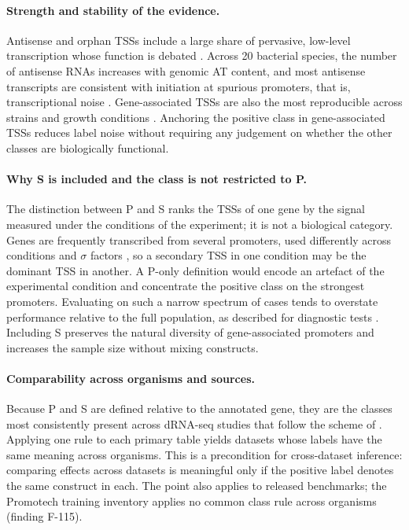 \paragraph{Strength and stability of the evidence.}
Antisense and orphan TSSs include a large share of pervasive, low-level
transcription whose function is debated \citep{wade2014pervasive}. Across 20
bacterial species, the number of antisense RNAs increases with genomic AT
content, and most antisense transcripts are consistent with initiation at
spurious promoters, that is, transcriptional noise
\citep{llorensrico2016antisense}. Gene-associated TSSs are also the most
reproducible across strains \citep{dugar2013campylobacter} and growth
conditions \citep{zhukova2017leptospira}. Anchoring the positive class in
gene-associated TSSs reduces label noise without requiring any judgement on
whether the other classes are biologically functional.

\paragraph{Why S is included and the class is not restricted to P.}
The distinction between P and S ranks the TSSs of one gene by the signal
measured under the conditions of the experiment; it is not a biological
category. Genes are frequently transcribed from several promoters, used
differently across conditions and $\sigma$ factors
\citep{cho2009transcription,mendozavargas2009genome}, so a secondary TSS in one
condition may be the dominant TSS in another. A P-only definition would encode
an artefact of the experimental condition and concentrate the positive class on
the strongest promoters. Evaluating on such a narrow spectrum of cases tends to
overstate performance relative to the full population, as described for
diagnostic tests \citep{ransohoff1978spectrum}. Including S preserves the
natural diversity of gene-associated promoters and increases the sample size
without mixing constructs.

\paragraph{Comparability across organisms and sources.}
Because P and S are defined relative to the annotated gene, they are the classes
most consistently present across dRNA-seq studies that follow the scheme of
\citet{sharma2010primary}
\citep{albrecht2011chlamydia,dugar2013campylobacter,thomason2015ecoli,zhukova2017leptospira}.
Applying one rule to each primary table yields datasets whose labels have the
same meaning across organisms. This is a precondition for cross-dataset
inference: comparing effects across datasets is meaningful only if the positive
label denotes the same construct in each. The point also applies to released
benchmarks; the Promotech training inventory
\citep{chevezguardado2021promotech} applies no common class rule across
organisms (finding F-115).

